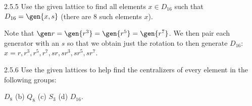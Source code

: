 \begin{exercise}{2.5.5}
    Use the given lattice to find all elements $x \in D_{16}$ such that $D_{16} = \gen{x, s}$ (there are 8 such elements $x$).
\end{exercise}

\begin{sol}
    Note that $\gen r= \gen{r^3} = \gen{r^5} = \gen{r^7}$.
	We then pair each generator with an $s$ so that we obtain just the rotation to then generate $D_{16}$: $x = r, r^3, r^5, r^7, sr, sr^3, sr^5, sr^7$.
\end{sol}

\begin{exercise}{2.5.6}
    Use the given lattices to help find the centralizers of every element in the following groups:
    \begin{subexercises}
        \item $D_8$ \quad (b) $Q_8$ \quad (c) $S_3$ \quad (d) $D_{16}$.
    \end{subexercises}
\end{exercise}

